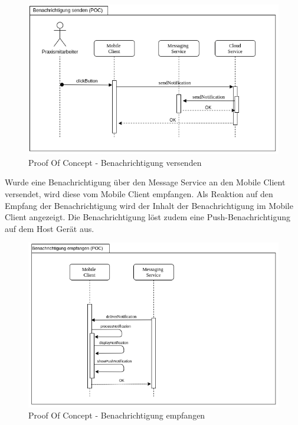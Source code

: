 \begin{figure}[h]
    \centering
    \begin{minipage}[b]{1.0\textwidth}
        \includegraphics[width=\textwidth]{graphics/Sequence_POC_Send}
        \caption{Proof Of Concept - Benachrichtigung versenden}
    \end{minipage}
\end{figure}

\clearpage

Wurde eine Benachrichtigung über den Message Service an den Mobile Client versendet, wird diese vom Mobile Client empfangen.
Als Reaktion auf den Empfang der Benachrichtigung wird der Inhalt der Benachrichtigung im Mobile Client angezeigt.
Die Benachrichtigung löst zudem eine Push-Benachrichtigung auf dem Host Gerät aus.

\begin{figure}[h]
    \centering
    \begin{minipage}[b]{1.0\textwidth}
        \includegraphics[width=\textwidth]{graphics/Sequence_POC_Receive}
        \caption{Proof Of Concept - Benachrichtigung empfangen}
    \end{minipage}
\end{figure}

\clearpage
